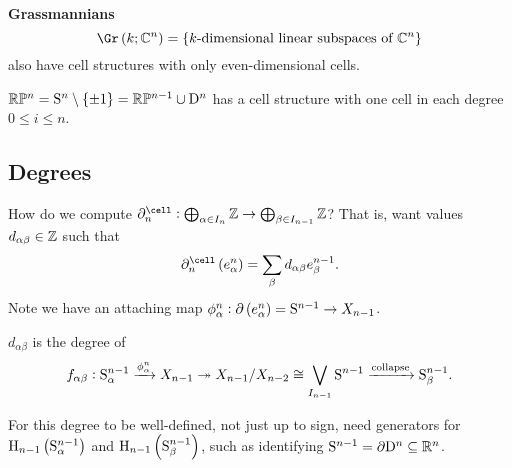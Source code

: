 \pagebreak

\begin{remark*}
\textbf{Grassmannians}
$$ \Gr\br{k; \CC^n} = \cbr{\text{$ k $-dimensional linear subspaces of} \ \CC^n} $$
also have cell structures with only even-dimensional cells.
\end{remark*}

\begin{exercise*}
$ \RR\PP^n = \S^n \setminus \cbr{\pm 1} = \RR\PP^{n - 1} \cup \D^n $ has a cell structure with one cell in each degree $ 0 \le i \le n $.
\end{exercise*}

\subsection{Degrees}

How do we compute $ \da_n^{\cell} : \bigoplus_{\alpha \in I_n} \ZZ \to \bigoplus_{\beta \in I_{n - 1}} \ZZ $? That is, want values $ d_{\alpha\beta} \in \ZZ $ such that
$$ \da_n^{\cell}\br{e_\alpha^n} = \sum_\beta d_{\alpha\beta}e_\beta^{n - 1}. $$
Note we have an attaching map $ \phi_\alpha^n : \da\br{e_\alpha^n} = \S^{n - 1} \to X_{n - 1} $.

\begin{lemma}
$ d_{\alpha\beta} $ is the degree of
$$ f_{\alpha\beta} : \S_\alpha^{n - 1} \xrightarrow{\phi_\alpha^n} X_{n - 1} \twoheadrightarrow X_{n - 1} / X_{n - 2} \cong \bigvee_{I_{n - 1}} \S^{n - 1} \xrightarrow{\text{collapse}} \S_\beta^{n - 1}. $$
\end{lemma}

\begin{remark*}
For this degree to be well-defined, not just up to sign, need generators for $ \H_{n - 1}\br{\S_\alpha^{n - 1}} $ and $ \H_{n - 1}\br{\S_\beta^{n - 1}} $, such as identifying $ \S^{n - 1} = \da\D^n \subseteq \RR^n $.
\end{remark*}


